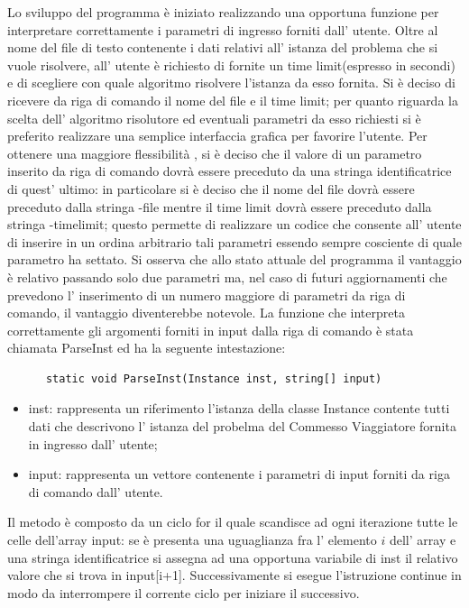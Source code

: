 \documentclass[11pt]{article}
\begin{document}
Lo sviluppo del programma \`e iniziato realizzando una opportuna funzione per interpretare correttamente i parametri di ingresso forniti dall' utente. Oltre al nome del file di testo contenente i dati relativi  all' istanza del problema che si vuole risolvere, all' utente \`e richiesto di fornite un time limit(espresso in secondi) e di scegliere con quale algoritmo risolvere l'istanza da esso fornita. Si \`e deciso di ricevere da riga di comando il nome del file e il time limit; per quanto riguarda la scelta dell' algoritmo risolutore ed eventuali parametri da esso richiesti si \`e preferito realizzare una semplice interfaccia grafica per favorire l'utente. 
Per ottenere una maggiore flessibilit\`a , si \`e deciso che il valore di un parametro inserito da riga di comando  dovr\`a essere preceduto da una stringa identificatrice di quest' ultimo: in particolare si \`e deciso che il nome del file dovr\`a essere preceduto dalla stringa -file mentre il time limit dovr\`a essere preceduto dalla stringa -timelimit; questo permette di realizzare un codice che consente all' utente di  inserire in un ordina arbitrario tali parametri essendo sempre cosciente di quale parametro ha settato. Si osserva che allo stato attuale del programma il vantaggio \`e relativo passando solo due parametri ma, nel caso di futuri aggiornamenti che prevedono l' inserimento di un numero maggiore di parametri da riga di comando, il vantaggio diventerebbe notevole.
La funzione che interpreta correttamente gli argomenti forniti in input dalla riga di comando \`e stata chiamata ParseInst ed ha la seguente intestazione:

\begin{lstlisting}
	  static void ParseInst(Instance inst, string[] input)    

\end{lstlisting}


\begin{itemize}
\item inst: rappresenta un riferimento l'istanza della classe Instance contente tutti dati che descrivono l' istanza del probelma del Commesso Viaggiatore fornita in ingresso dall' utente;
\item input: rappresenta un vettore contenente i parametri di input forniti da riga di comando dall' utente.
\end{itemize}


Il metodo \`e composto da un ciclo for il quale scandisce ad ogni iterazione tutte le celle dell'array input: se \`e presenta una uguaglianza fra l' elemento $i$ dell' array e una stringa identificatrice si assegna ad una opportuna variabile di inst il relativo valore che si trova in input[i+1]. Successivamente si esegue l'istruzione continue in modo da interrompere il corrente ciclo per iniziare il successivo.
\end{document}
